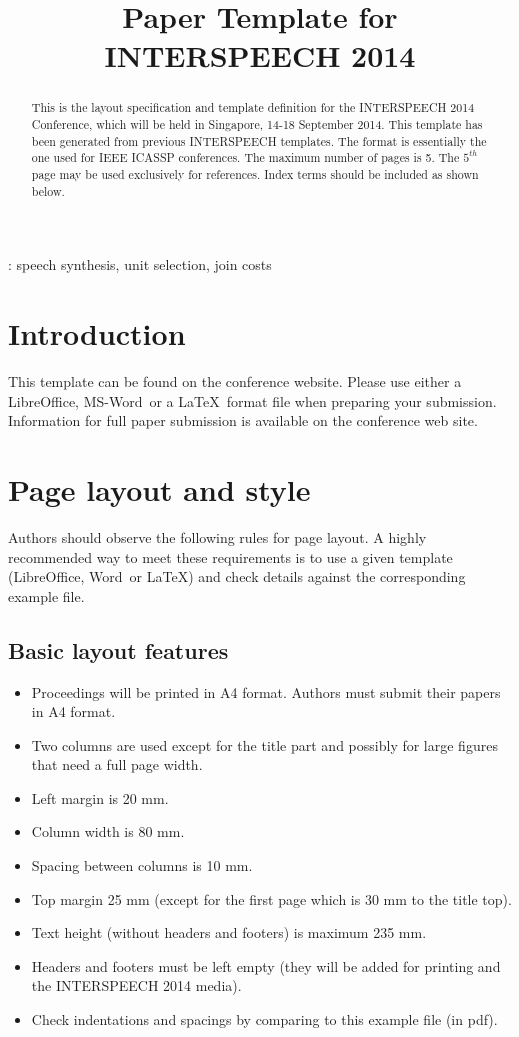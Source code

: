 \documentclass[a4paper]{article}
\title{Paper Template for INTERSPEECH 2014}
\def\reg{{\rm\ooalign{\hfil
     \raise.07ex\hbox{\scriptsize R}\hfil\crcr\mathhexbox20D}}}
\begin{document}
\maketitle
%
\begin{abstract}
This is the layout specification and template definition for the
INTERSPEECH 2014 Conference, which will be held in Singapore, 14-18
September 2014. This template has been generated from previous
INTERSPEECH templates. The format is essentially the one used for
IEEE ICASSP conferences. The maximum number of pages is 5. The
$5^{th}$ page may be used exclusively for references. Index terms
should be included as shown below.
\end{abstract}
: speech synthesis, unit selection, join costs



%
\section{Introduction}

This template can be found on the conference website. Please use
either a LibreOffice, MS-Word\reg\ or a \LaTeX\ format file when preparing your
submission. Information for full paper submission is available on the
conference web site.

\section{Page layout and style}

Authors should observe the following rules for page layout. A
highly recommended way to meet these requirements is to use a given
template (LibreOffice, Word\reg\ or \LaTeX) and check details against the
corresponding example file.

\subsection{Basic layout features}

\begin{itemize}
\item Proceedings will be printed in A4 format. Authors must submit their papers
in A4 format.
\item Two columns are used except for the title part and possibly for large
figures that need a full page width.
\item Left margin is 20 mm.
\item Column width is 80 mm.
\item Spacing between columns is 10 mm.
\item Top margin 25 mm (except for the first page which is 30 mm to the title top).
\item Text height (without headers and footers) is maximum 235 mm.
\item Headers and footers must be left empty (they will be added for
printing and the INTERSPEECH 2014 media).
\item Check indentations and spacings by comparing to this
example file (in pdf).
\end{itemize}
\end{document}
